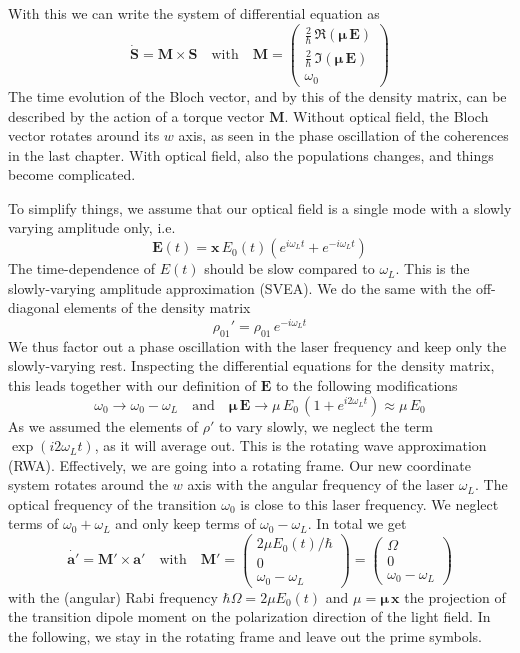 With this we can write the system of differential equation as 
\[
 \dot{\boldsymbol{S}} = \boldsymbol{M}   \times \boldsymbol{S} 
 \quad \text{with} \quad 
 \boldsymbol{M}  = 
 \begin{pmatrix}
 \frac{2}{\hbar} \, \Re ( \boldsymbol{\mu} \, \boldsymbol{E} ) \\
  \frac{2}{\hbar} \, \Im ( \boldsymbol{\mu} \, \boldsymbol{E} ) \\
  \omega_0
 \end{pmatrix}
\]
The time evolution of the Bloch vector, and by this of the density matrix, can be described by the action of a torque vector $\boldsymbol{M}$. Without optical field, the Bloch vector rotates around its $w$ axis, as seen in the phase oscillation of the coherences in the last chapter. With optical field, also the populations changes, and things become complicated.

To simplify things, we assume that our optical field is a single mode with a slowly varying amplitude only, i.e.
\[
 \boldsymbol{E}(t) = \boldsymbol{x} \, E_0(t) \left( e^{i \omega_L t} + e^{-i \omega_L t} \right)
\]
The time-dependence of $E(t)$ should be slow compared to $\omega_L$. This is the slowly-varying amplitude approximation (SVEA). We do the same with the off-diagonal elements of the density matrix
\[
 \rho_{01}' = \rho_{01} \, e^{-i \omega_L t} 
\]
We thus factor out a phase oscillation with the laser frequency and keep only the slowly-varying rest. Inspecting the differential equations for the density matrix, this leads together with our definition of $\boldsymbol{E}$ to the following modifications
\[
 \omega_0 \rightarrow \omega_0 - \omega_L \quad \text{and} \quad 
 \boldsymbol{\mu} \, \boldsymbol{E}  \rightarrow \mu \, E_0  \, ( 1+ e^{i 2\omega_L t} ) \approx \mu \, E_0 
\]
As we assumed the elements of $\rho'$ to vary slowly, we neglect the term $\exp(i 2 \omega_L t)$, as it will average out.  This is the rotating wave approximation (RWA). Effectively, we are going into a 
rotating frame. Our new coordinate system rotates around the $w$ axis with the angular frequency of the laser $\omega_L$. The optical frequency of the transition $\omega_0$ is close to this laser frequency. We neglect terms of $\omega_0 + \omega_L$ and only keep terms of  $\omega_0 - \omega_L$. In total we get
\[
 \dot{\boldsymbol{a}'} = \boldsymbol{M}'   \times \boldsymbol{a}' 
 \quad \text{with} \quad 
 \boldsymbol{M}'  = 
 \begin{pmatrix}
2 \mu    E_0(t) / \hbar \\
0 \\
\omega_0 - \omega_L
 \end{pmatrix} = 
  \begin{pmatrix}
\Omega \\
0 \\
\omega_0 - \omega_L
 \end{pmatrix}
\]
with the (angular) Rabi frequency $\hbar \Omega = 2 \mu    E_0(t) $ and $\mu = \boldsymbol{\mu \, x}$ the projection of the transition dipole moment on the polarization direction of the light field. In the following, we stay in the rotating frame and leave out the prime symbols.


